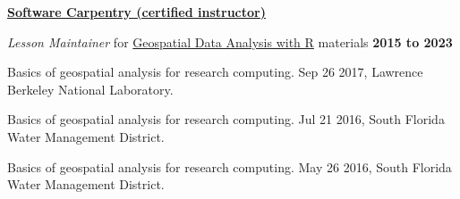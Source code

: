 \documentclass[11pt]{article}
\renewcommand{\section}[1]{\pagebreak[3]%
    \vspace{1.3\baselineskip}%
    \phantomsection\addcontentsline{toc}{section}{#1}%
    \noindent\llap{\scshape\smash{\parbox[t]{\marginparwidth}{\hyphenpenalty=10000\raggedright #1}}}%
    \vspace{-\baselineskip}\par}
\newcommand{\halfblankline}{\quad\vspace{-0.5\baselineskip}\pagebreak[3]}
\begin{document}
\href{https://software-carpentry.org/}{\textbf{Software Carpentry (certified instructor)}}
\begin{outerlist}

    \item[] {\emph{Lesson Maintainer} for \href{https://datacarpentry.org/lessons/}{Geospatial Data Analysis with R} materials}
    \hfill \textbf{2015 to 2023}

    \item[]
    \begin{innerlist}
        \item Basics of geospatial analysis for research computing. Sep 26 2017, Lawrence Berkeley National Laboratory.
        \item Basics of geospatial analysis for research computing. Jul 21 2016, South Florida Water Management District.
        \item Basics of geospatial analysis for research computing. May 26 2016, South Florida Water Management District.
    \end{innerlist}

\end{outerlist}






\end{document}

